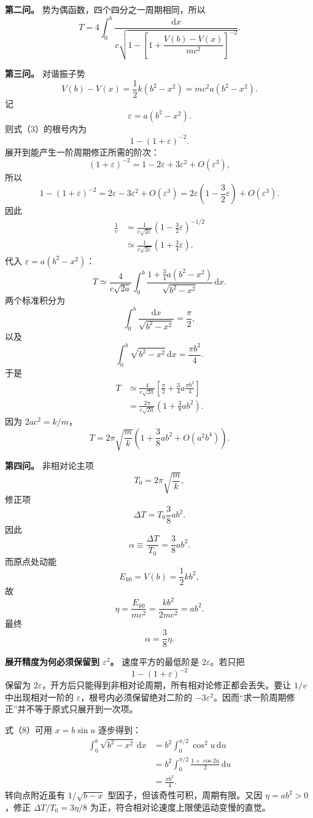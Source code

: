 \documentclass[12pt,a4paper,UTF8]{ctexart}
\begin{document}
\textbf{第二问。} 势为偶函数，四个四分之一周期相同，所以 \[
\boxed{
T=4\int_0^b\frac{\mathrm dx}
{c\sqrt{
1-\left[
1+\dfrac{V(b)-V(x)}{mc^2}
\right]^{-2}
}}
}. \tag{4}
\]

\textbf{第三问。} 对谐振子势 \[
V(b)-V(x)=\frac12k(b^2-x^2)
=mc^2a(b^2-x^2).
\] 记 \[
\varepsilon=a(b^2-x^2).
\] 则式（3）的根号内为 \[
1-(1+\varepsilon)^{-2}.
\] 展开到能产生一阶周期修正所需的阶次： \[
(1+\varepsilon)^{-2}
=1-2\varepsilon+3\varepsilon^2+O(\varepsilon^3),
\] 所以 \[
1-(1+\varepsilon)^{-2}
=2\varepsilon-3\varepsilon^2+O(\varepsilon^3)
=2\varepsilon\left(1-\frac32\varepsilon\right)+O(\varepsilon^3).
\] 因此 \[
\begin{aligned}
\frac1v
&=\frac1{c\sqrt{2\varepsilon}}
\left(1-\frac32\varepsilon\right)^{-1/2}\\
&\simeq\frac1{c\sqrt{2\varepsilon}}
\left(1+\frac34\varepsilon\right).
\end{aligned} \tag{5}
\] 代入 \(\varepsilon=a(b^2-x^2)\)： \[
T\simeq
\frac4{c\sqrt{2a}}
\int_0^b
\frac{1+\frac34a(b^2-x^2)}
{\sqrt{b^2-x^2}}\,\mathrm dx. \tag{6}
\] 两个标准积分为 \[
\int_0^b\frac{\mathrm dx}{\sqrt{b^2-x^2}}
=\frac\pi2, \tag{7}
\] 以及 \[
\int_0^b\sqrt{b^2-x^2}\,\mathrm dx
=\frac{\pi b^2}{4}. \tag{8}
\] 于是 \[
\begin{aligned}
T
&\simeq\frac4{c\sqrt{2a}}
\left[
\frac\pi2+\frac34a\frac{\pi b^2}{4}
\right]\\
&=\frac{2\pi}{c\sqrt{2a}}
\left(1+\frac38ab^2\right).
\end{aligned}
\] 因为 \(2ac^2=k/m\)， \[
\boxed{
T=2\pi\sqrt{\frac mk}
\left(1+\frac38ab^2+O(a^2b^4)\right)
}. \tag{9}
\]

\textbf{第四问。} 非相对论主项 \[
T_0=2\pi\sqrt{\frac mk},
\] 修正项 \[
\Delta T=T_0\frac38ab^2.
\] 因此 \[
\alpha\equiv\frac{\Delta T}{T_0}
=\frac38ab^2. \tag{10}
\] 而原点处动能 \[
E_{k0}=V(b)=\frac12kb^2,
\] 故 \[
\eta=\frac{E_{k0}}{mc^2}
=\frac{kb^2}{2mc^2}=ab^2.
\] 最终 \[
\boxed{\alpha=\frac38\eta}. \tag{11}
\]

\textbf{展开精度为何必须保留到 \(\varepsilon^2\)。} 速度平方的最低阶是
\(2\varepsilon\)。若只把 \[
1-(1+\varepsilon)^{-2}
\] 保留为
\(2\varepsilon\)，开方后只能得到非相对论周期，所有相对论修正都会丢失。要让
\(1/v\) 中出现相对一阶的 \(\varepsilon\)，根号内必须保留绝对二阶的
\(-3\varepsilon^2\)。因而``求一阶周期修正''并不等于原式只展开到一次项。

式（8）可用 \(x=b\sin u\) 逐步得到： \[
\begin{aligned}
\int_0^b\sqrt{b^2-x^2}\,\mathrm dx
&=b^2\int_0^{\pi/2}\cos^2u\,\mathrm du\\
&=b^2\int_0^{\pi/2}\frac{1+\cos2u}{2}\,\mathrm du\\
&=\frac{\pi b^2}{4}.
\end{aligned}
\] 转向点附近虽有 \(1/\sqrt{b-x}\) 型因子，但该奇性可积，周期有限。又因
\(\eta=ab^2>0\)，修正 \(\Delta T/T_0=3\eta/8\)
为正，符合相对论速度上限使运动变慢的直觉。
\end{document}
